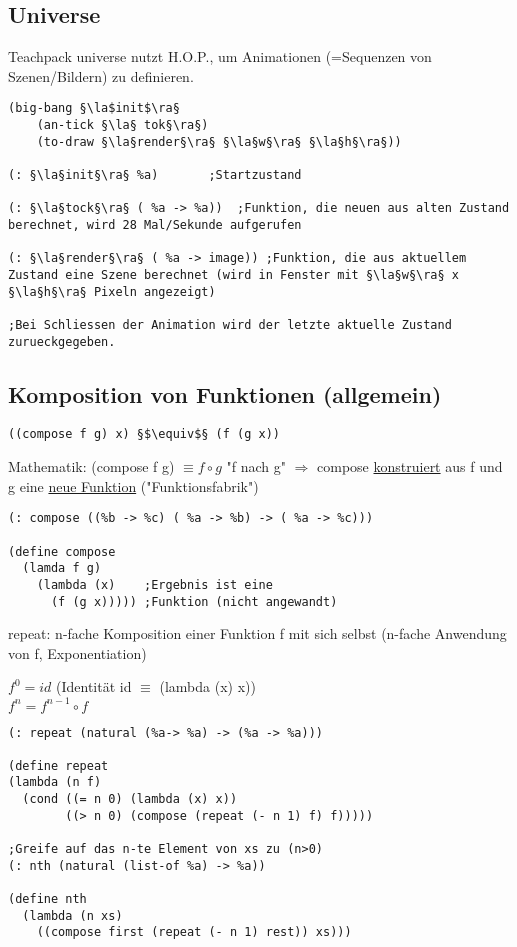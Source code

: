 \documentclass[a4paper,12pt]{article}
\newcommand{\la}{$\langle$}
\newcommand{\ra}{$\rangle$}
\begin{document}
\subsection{Universe}
Teachpack universe nutzt H.O.P., um Animationen (=Sequenzen von Szenen/Bildern) zu definieren.
\begin{lstlisting}[style=customc]
(big-bang §\la$init$\ra§
	(an-tick §\la§ tok§\ra§)
	(to-draw §\la§render§\ra§ §\la§w§\ra§ §\la§h§\ra§))
		   
(: §\la§init§\ra§ %a)    	;Startzustand

(: §\la§tock§\ra§ ( %a -> %a))	;Funktion, die neuen aus alten Zustand berechnet, wird 28 Mal/Sekunde aufgerufen 

(: §\la§render§\ra§ ( %a -> image)) ;Funktion, die aus aktuellem Zustand eine Szene berechnet (wird in Fenster mit §\la§w§\ra§ x §\la§h§\ra§ Pixeln angezeigt)

;Bei Schliessen der Animation wird der letzte aktuelle Zustand zurueckgegeben.

\end{lstlisting}
\subsection{Komposition von Funktionen (allgemein)}
\begin{lstlisting}[style=customc]
((compose f g) x) §$\equiv$§ (f (g x))
\end{lstlisting}
Mathematik: (compose f g) $\equiv f \circ g $ "f nach g" $\Rightarrow$ compose \uline{konstruiert} aus f und g eine \uline{neue Funktion} ("Funktionsfabrik")
\begin{lstlisting}[style=customc]
(: compose ((%b -> %c) ( %a -> %b) -> ( %a -> %c)))

(define compose
  (lamda f g)
    (lambda (x)    ;Ergebnis ist eine
      (f (g x))))) ;Funktion (nicht angewandt)
\end{lstlisting}

repeat: n-fache Komposition einer Funktion f mit sich selbst (n-fache Anwendung von f, Exponentiation)
\begin{center}
$f^0 = id$ (Identität id $\equiv$ (lambda (x) x))\\
$f^n = f^{n-1} \circ f$
\end{center}
\begin{lstlisting}[style=customc]
(: repeat (natural (%a-> %a) -> (%a -> %a)))

(define repeat
(lambda (n f)
  (cond ((= n 0) (lambda (x) x))
        ((> n 0) (compose (repeat (- n 1) f) f)))))
        
;Greife auf das n-te Element von xs zu (n>0)
(: nth (natural (list-of %a) -> %a)) 

(define nth
  (lambda (n xs)
    ((compose first (repeat (- n 1) rest)) xs)))        
\end{lstlisting}
\end{document}
